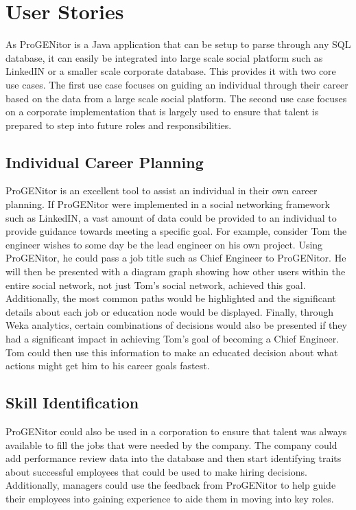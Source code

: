\section{User Stories}
\label{sect:user-stories}
	As ProGENitor is a Java application that can be setup to parse through any SQL
database, it can easily be integrated into large scale social platform such as
LinkedIN or a smaller scale corporate database.  This provides it with two core
use cases.  The first use case focuses on guiding an individual through their
career based on the data from a large scale social platform.  The second use
case focuses on a corporate implementation that is largely used to ensure that talent is
prepared to step into future roles and responsibilities.
\subsection{Individual Career Planning}
		ProGENitor is an excellent tool to assist an individual in their own career
	planning.  If ProGENitor were implemented in a social networking framework such
	as LinkedIN, a vast amount of data could be provided to an individual to
	provide guidance towards meeting a specific goal.  For example, consider Tom
	the engineer wishes to some day be the lead engineer on his own project.  Using
	ProGENitor, he could pass a job title such as Chief Engineer to ProGENitor.  He
	will then be presented with a diagram graph showing how other users within
	the entire social network, not just Tom's social network, achieved this goal. 
	Additionally, the most common paths would be highlighted and the significant
	details about each job or education node would be displayed.  Finally,
	through Weka analytics, certain combinations of decisions would also be
	presented if they had a significant impact in achieving Tom's goal of
	becoming a Chief Engineer.  Tom could then use this information to make an
	educated decision about what actions might get him to his career goals fastest.
\subsection{Skill Identification}
		ProGENitor could also be used in a corporation to ensure that talent was
	always available to fill the jobs that were needed by the company.  The company
	could add performance review data into the database and then start identifying
	traits about successful employees that could be used to make hiring decisions. 
	Additionally, managers could use the feedback from ProGENitor to help guide
	their employees into gaining experience to aide them in moving into key roles. 
	
